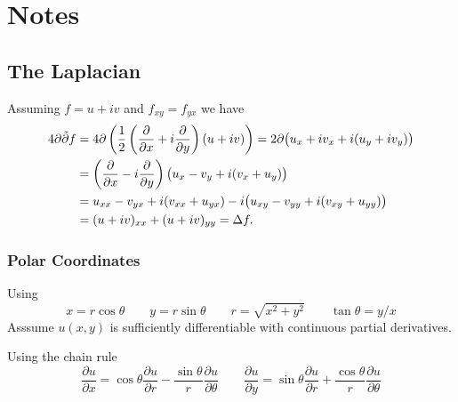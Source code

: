 
\section{Notes}

\subsection{The Laplacian}

\newcommand*{\partialby}[1]{\frac{\partial}{\partial #1}}
\newcommand*{\fracpart}[2]{\frac{\partial #1}{\partial #2}}
\newcommand*{\dpartial}[2]{\frac{\partial^2 #1}{\partial #2^2}}
\newcommand*{\px}{\partialby x}
\newcommand*{\py}{\partialby y}

Assuming \(f = u + iv\) and \(f_{xy} = f_{yx}\) we have
\begin{align*}
4\partial\tilde{\partial}f 
 &= 4\partial\left(\half\left(\px + i\py\right)(u + iv)\right)
  = 2\partial\bigl(u_x + iv_x + i(u_y + iv_y)\bigr) \\
 &= \left(\px - i\py\right)\bigl(u_x - v_y + i(v_x + u_y)\bigr) \\
 &= u_{xx} - v_{yx}  + i(v_{xx} + u_{yx}) 
    -i\bigl(u_{xy} - v_{yy} + i(v_{xy} + u_{yy})\bigr) \\
 &= (u + iv)_{xx} + (u + iv)_{yy} = \Delta f.
\end{align*}

\subsubsection{Polar Coordinates}

Using
\begin{equation*}
x = r\cos\theta \qquad
y = r\sin\theta \qquad
r = \sqrt{x^2+y^2} \qquad
\tan \theta = y/x
\end{equation*}
Asssume \(u(x,y)\) is sufficiently differentiable with continuous
partial derivatives.

Using the chain rule
\begin{equation*}
\fracpart{u}{x} 
  = \cos \theta \fracpart{u}{r} 
    - \frac{\sin \theta}{r}\fracpart{u}{\theta} 
  \qquad
\fracpart{u}{y} 
  = \sin \theta \fracpart{u}{r} 
    + \frac{\cos \theta}{r}\fracpart{u}{\theta}
\end{equation*}

